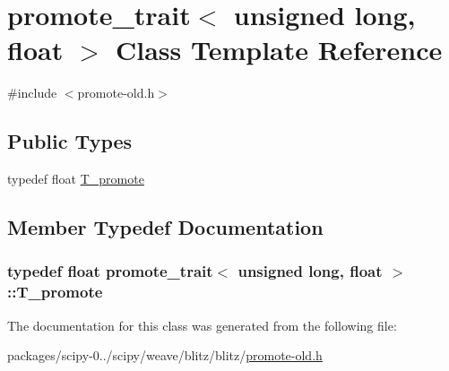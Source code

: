 \hypertarget{classpromote__trait_3_01unsigned_01long_00_01float_01_4}{}\section{promote\+\_\+trait$<$ unsigned long, float $>$ Class Template Reference}
\label{classpromote__trait_3_01unsigned_01long_00_01float_01_4}


{\ttfamily \#include $<$promote-\/old.\+h$>$}

\subsection*{Public Types}
\begin{DoxyCompactItemize}
\item 
typedef float \hyperlink{classpromote__trait_3_01unsigned_01long_00_01float_01_4_a918f36763065d027b56e893d2c8acc7c}{T\+\_\+promote}
\end{DoxyCompactItemize}


\subsection{Member Typedef Documentation}
\hypertarget{classpromote__trait_3_01unsigned_01long_00_01float_01_4_a918f36763065d027b56e893d2c8acc7c}{}
\subsubsection[{T\+\_\+promote}]{\setlength{\rightskip}{0pt plus 5cm}typedef float {\bf promote\+\_\+trait}$<$ unsigned long, float $>$\+::{\bf T\+\_\+promote}}\label{classpromote__trait_3_01unsigned_01long_00_01float_01_4_a918f36763065d027b56e893d2c8acc7c}


The documentation for this class was generated from the following file\+:\begin{DoxyCompactItemize}
\item 
packages/scipy-\/0../scipy/weave/blitz/blitz/\hyperlink{promote-old_8h}{promote-\/old.\+h}\end{DoxyCompactItemize}
